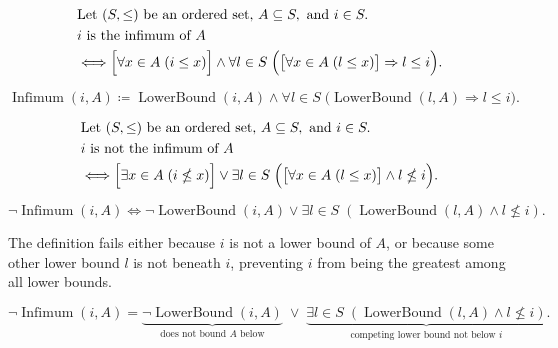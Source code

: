\begin{remark*}
\[
\begin{aligned}
&\text{Let }(S,\le)\text{ be an ordered set, }A\subseteq S,\text{ and }i\in S.\\
&i\text{ is the infimum of }A\\
&\Longleftrightarrow\Bigl[\forall x\in A\;(i\le x)\Bigr]\land\forall l\in S\;\Bigl(\bigl[\forall x\in A\;(l\le x)\bigr]\Rightarrow l\le i\Bigr).
\end{aligned}
\]
\end{remark*}

\begin{remark*}
\[
\operatorname{Infimum}(i,A)\coloneqq \operatorname{LowerBound}(i,A)\land \forall l\in S\;\bigl(\operatorname{LowerBound}(l,A)\Rightarrow l\le i\bigr).
\]
\end{remark*}

\begin{remark*}
\[
\begin{aligned}
&\text{Let }(S,\le)\text{ be an ordered set, }A\subseteq S,\text{ and }i\in S.\\
&i\text{ is not the infimum of }A\\
&\Longleftrightarrow \Bigl[\exists x\in A\;(i\nleq x)\Bigr]\lor \exists l\in S\;\Bigl(\bigl[\forall x\in A\;(l\le x)\bigr]\land l\nleq i\Bigr).
\end{aligned}
\]
\end{remark*}

\begin{remark*}
\[
\neg\operatorname{Infimum}(i,A)\Longleftrightarrow \neg\operatorname{LowerBound}(i,A)\lor \exists l\in S\;(\operatorname{LowerBound}(l,A)\land l\nleq i).
\]
\end{remark*}

\begin{remark*}
The definition fails either because $i$ is not a lower bound of $A$, or because some other lower bound $l$ is not beneath $i$, preventing $i$ from being the greatest among all lower bounds.
\end{remark*}

\begin{remark*}
\[
\neg\operatorname{Infimum}(i,A)=
\underbrace{\neg\operatorname{LowerBound}(i,A)}_{\text{does not bound }A\text{ below}}
\;\lor\;
\underbrace{\exists l\in S\;(\operatorname{LowerBound}(l,A)\land l\nleq i)}_{\text{competing lower bound not below }i}.
\]
\end{remark*}

